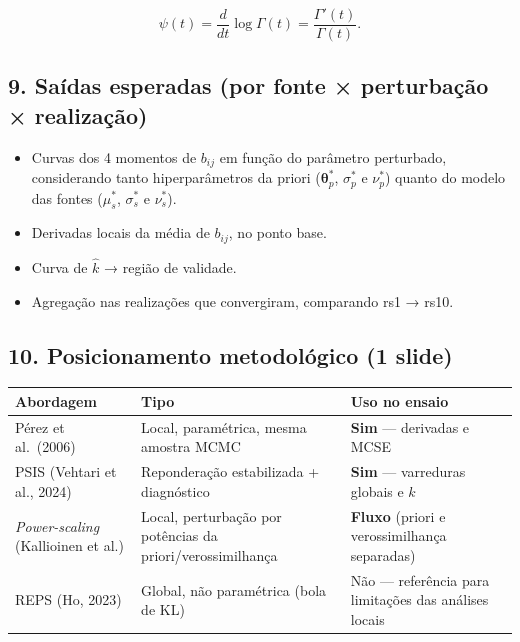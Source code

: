 \documentclass[11pt]{article}
\providecommand{\tightlist}{%
      \setlength{\itemsep}{0pt}\setlength{\parskip}{0pt}}
\newcounter{none}
\begin{document}
\[\psi(t) = \frac{d}{dt}\log\Gamma(t) = \frac{\Gamma'(t)}{\Gamma(t)}.\]

\subsection{9. Saídas esperadas (por fonte × perturbação ×
realização)}\label{sauxeddas-esperadas-por-fonte-perturbauxe7uxe3o-realizauxe7uxe3o}

\begin{itemize}
\tightlist
\item
  Curvas dos 4 momentos de \(b_{ij}\) em função do parâmetro perturbado,
  considerando tanto hiperparâmetros da priori
  (\(\boldsymbol\theta_p^{*}\), \(\sigma_p^{*}\) e \(\nu_p^{*}\)) quanto
  do modelo das fontes (\(\mu_s^{*}\), \(\sigma_s^{*}\) e
  \(\nu_s^{*}\)).
\item
  Derivadas locais da média de \(b_{ij}\), no ponto base.
\item
  Curva de \(\hat k\) → região de validade.
\item
  Agregação nas realizações que convergiram, comparando rs1 → rs10.
\end{itemize}

\subsection{10. Posicionamento metodológico (1
slide)}\label{posicionamento-metodoluxf3gico-1-slide}

{\def\LTcaptype{none} %
\begin{longtable}[]{@{}
  >{\raggedright\arraybackslash}p{}
  >{\raggedright\arraybackslash}p{}
  >{\raggedright\arraybackslash}p{}@{}}
\toprule\noalign{}
\begin{minipage}[b]{\linewidth}\raggedright
Abordagem
\end{minipage} & \begin{minipage}[b]{\linewidth}\raggedright
Tipo
\end{minipage} & \begin{minipage}[b]{\linewidth}\raggedright
Uso no ensaio
\end{minipage} \\
\midrule\noalign{}
\endhead
\bottomrule\noalign{}
\endlastfoot
Pérez et al.~(2006) & Local, paramétrica, mesma amostra MCMC &
\textbf{Sim} --- derivadas e MCSE \\
PSIS (Vehtari et al., 2024) & Reponderação estabilizada + diagnóstico &
\textbf{Sim} --- varreduras globais e \(\hat k\) \\
\emph{Power-scaling} (Kallioinen et al.) & Local, perturbação por
potências da priori/verossimilhança & \textbf{Fluxo} (priori e
verossimilhança separadas) \\
REPS (Ho, 2023) & Global, não paramétrica (bola de KL) & Não ---
referência para limitações das análises locais \\
\end{longtable}
}


    
    
    
\end{document}
